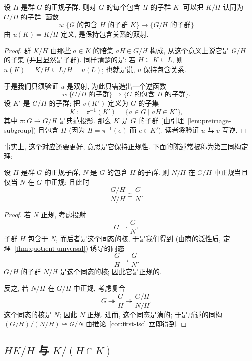 \begin{proposition}
\label{prop:quotient-subgroups}
设 $H$ 是群 $G$ 的正规子群. 则对 $G$ 的每个包含 $H$ 的子群 $K$, 可以把 $K/H$ 认同为 $G/H$ 的子群. 函数
\[
u : \{\text{$G$ 的包含 } H \text{ 的子群 } K\} \to \{\text{$G/H$ 的子群}\}
\]
由 $u(K) = K/H$ 定义, 是保持包含关系的双射.
\end{proposition}

\begin{proof}
群 $K/H$ 由那些 $a \in K$ 的陪集 $aH \in G/H$ 构成, 从这个意义上说它是 $G/H$ 的子集 (并且显然是子群). 同样清楚的是: 若 $H \subseteq K \subseteq L$, 则 $u(K) = K/H \subseteq L/H = u(L)$; 也就是说, $u$ 保持包含关系.

于是我们只须验证 $u$ 是双射, 为此只需造出一个逆函数
\[
v : \{\text{$G/H$ 的子群}\} \to \{\text{$G$ 的包含 } H \text{ 的子群}\}.
\]
设 $K'$ 是 $G/H$ 的子群; 把 $v(K')$ 定义为 $G$ 的子集
\[
K := \pi^{-1}(K') = \{a \in G \mid aH \in K'\},
\]
其中 $\pi : G \to G/H$ 是典范投影. 那么 $K$ 是 $G$ 的子群 (由引理~\ref{lem:preimage-subgroup}) 且包含 $H$ (因为 $H = \pi^{-1}(e)$ 而 $e \in K'$). 读者将验证 $u$ 与 $v$ 互逆.
\end{proof}

事实上, 这个对应还要更好, 意思是它保持正规性. 下面的陈述常被称为第三同构定理:

\begin{proposition}
\label{prop:third-iso}
设 $H$ 是群 $G$ 的正规子群, $N$ 是 $G$ 的包含 $H$ 的子群. 则 $N/H$ 在 $G/H$ 中正规当且仅当 $N$ 在 $G$ 中正规; 且此时
\[
\frac{G/H}{N/H} \cong \frac{G}{N}.
\]
\end{proposition}

\begin{proof}
若 $N$ 正规, 考虑投射
\[
G \to \frac{G}{N}:
\]
子群 $H$ 包含于 $N$, 而后者是这个同态的核, 于是我们得到 (由商的泛性质, 定理~\ref{thm:quotient-universal}) 诱导的同态
\[
\frac{G}{H} \rightarrow \frac{G}{N}.
\]
$G/H$ 的子群 $N/H$ 是这个同态的核; 因此它是正规的.

反之, 若 $N/H$ 在 $G/H$ 中正规, 考虑复合
\[
G \twoheadrightarrow \frac{G}{H} \twoheadrightarrow \frac{G/H}{N/H}.
\]
这个同态的核是 $N$; 因此 $N$ 正规. 进而, 这个同态是满的; 于是所述的同构 $(G/H)/(N/H) \cong G/N$ 由推论~\ref{cor:first-iso} 立即得到.
\end{proof}

\subsection{\texorpdfstring{$HK/H$ 与 $K/(H \cap K)$}{HK/H 与 K/(H 交 K)}}
\label{subsec:second-iso}

